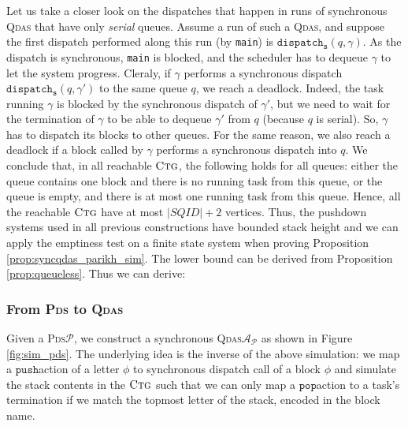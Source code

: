 \documentclass[runningheads,oribibl,]{article}
\newcommand{\Aa}{\ensuremath{\mathcal{A}}\xspace}
\newcommand{\Pp}{\ensuremath{\mathcal{P}}\xspace}
\newcommand{\cfont}[1]{\ensuremath{\mathtt{#1}}\xspace}
\newcommand{\pds}{\textsc{Pds}\xspace}
\newcommand{\qdas}{\textsc{Qdas}\xspace}
\newcommand{\ctg}{\ensuremath{\textsc{Ctg}}\xspace}
\newcommand{\disps}{\ensuremath{\cfont{dispatch_s}}}
\newcommand{\push}{\ensuremath{\cfont{push}}}
\newcommand{\pop}{\ensuremath{\cfont{pop}}}
\begin{document}
Let us take a closer look on the dispatches that happen in runs of
synchronous \qdas that have only \emph{serial} queues. Assume a run of
such a \qdas, and suppose the first dispatch performed along this run
(by \texttt{main}) is $\disps(q,\gamma)$. As the dispatch is
synchronous, \texttt{main} is blocked, and the scheduler has to
dequeue $\gamma$ to let the system progress. Cleraly, if $\gamma$
performs a synchronous dispatch $\disps(q,\gamma')$ to the same queue
$q$, we reach a deadlock. Indeed, the task running $\gamma$ is blocked
by the synchronous dispatch of $\gamma'$, but we need to wait for the
termination of $\gamma$ to be able to dequeue $\gamma'$ from $q$
(because $q$ is serial). So, $\gamma$ has to dispatch its blocks to
other queues. For the same reason, we also reach a deadlock if a block
called by $\gamma$ performs a synchronous dispatch into $q$. We
conclude that, in all reachable \ctg, the following holds for all
queues: either the queue contains one block and there is no running
task from this queue, or the queue is empty, and there is at most one
running task from this queue.  Hence, all the reachable \ctg have at
most $\vert SQID\vert +2$ vertices.  Thus, the pushdown systems used
in all previous constructions have bounded stack height and we can
apply the emptiness test on a finite state system when proving
Proposition\,\ref{prop:syncqdas_parikh_sim}.  The lower bound can be
derived from Proposition\,\ref{prop:queueless}. Thus we can derive:

\propsyncqdasparikhsim*

\subsubsection{From \pds to \qdas}

Given a \pds $\Pp$, we construct a synchronous \qdas $\Aa_\Pp$ as shown in
Figure\,\ref{fig:sim_pds}. The underlying idea is the inverse of
the above simulation: we map a \push action of a letter $\phi$ to synchronous
dispatch call of a block $\phi$ and simulate the stack contents in the \ctg such
that we can only map a \pop action to a task's termination if we match the
topmost letter of the stack, encoded in the block name.
\end{document}
